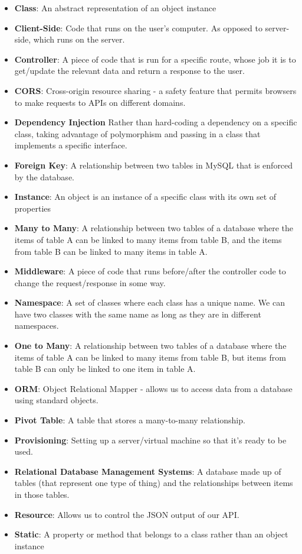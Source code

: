 \begin{itemize}[leftmargin=*]
    \item
        \textbf{Class}:
        An abstract representation of an object instance
    \item
        \textbf{Client-Side}:
        Code that runs on the user's computer. As opposed to server-side, which runs on the server.
    \item
        \textbf{Controller}:
        A piece of code that is run for a specific route, whose job it is to get/update the relevant data and return a response to the user.
    \item
        \textbf{CORS}:
        Cross-origin resource sharing - a safety feature that permits browsers to make requests to APIs on different domains.
    \item
        \textbf{Dependency Injection}
        Rather than hard-coding a dependency on a specific class, taking advantage of polymorphism and passing in a class that implements a specific interface.
    \item
        \textbf{Foreign Key}:
        A relationship between two tables in MySQL that is enforced by the database.
    \item
        \textbf{Instance}:
        An object is an instance of a specific class with its own set of properties
    \item
        \textbf{Many to Many}:
        A relationship between two tables of a database where the items of table A can be linked to many items from table B, and the items from table B can be linked to many items in table A.
    \item
        \textbf{Middleware}:
        A piece of code that runs before/after the controller code to change the request/response in some way.
    \item
        \textbf{Namespace}:
        A set of classes where each class has a unique name. We can have two classes with the same name as long as they are in different namespaces.
    \item
        \textbf{One to Many}:
        A relationship between two tables of a database where the items of table A can be linked to many items from table B, but items from table B can only be linked to one item in table A.
    \item
        \textbf{ORM}:
        Object Relational Mapper - allows us to access data from a database using standard objects.
    \item
        \textbf{Pivot Table}:
        A table that stores a many-to-many relationship.
    \item
        \textbf{Provisioning}:
        Setting up a server/virtual machine so that it's ready to be used.
    \item
        \textbf{Relational Database Management Systems}:
        A database made up of tables (that represent one type of thing) and the relationships between items in those tables.
    \item
        \textbf{Resource}:
        Allows us to control the JSON output of our API.
    \item
        \textbf{Static}:
        A property or method that belongs to a class rather than an object instance
\end{itemize}
